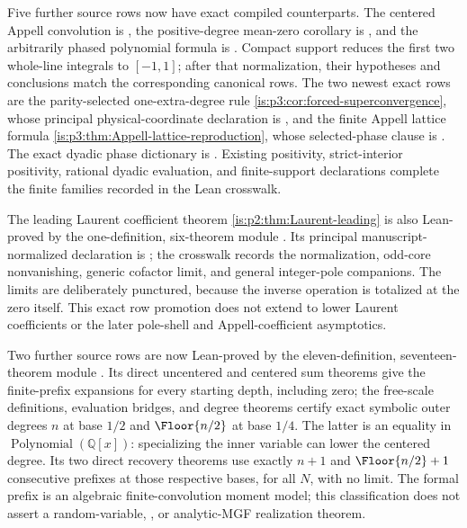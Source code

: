 Five further source rows now have exact compiled counterparts.  The centered
Appell convolution is
,
the positive-degree mean-zero corollary is
,
and the arbitrarily phased polynomial formula is
.
Compact support reduces the first two whole-line integrals to \([-1,1]\);
after that normalization, their hypotheses and conclusions match the
corresponding canonical rows.  The two newest exact rows are the
parity-selected one-extra-degree rule
\cref{is:p3:cor:forced-superconvergence}, whose principal physical-coordinate
declaration is
,
and the finite Appell lattice formula
\cref{is:p3:thm:Appell-lattice-reproduction}, whose selected-phase clause is
.
The exact dyadic phase dictionary is
.  Existing positivity,
strict-interior positivity, rational dyadic evaluation, and finite-support
declarations complete the finite families recorded in the Lean crosswalk.

The leading Laurent coefficient theorem
\cref{is:p2:thm:Laurent-leading} is also Lean-proved by the one-definition,
six-theorem module .  Its principal
manuscript-normalized declaration is
; the crosswalk
records the normalization, odd-core nonvanishing, generic cofactor limit, and
general integer-pole companions.  The limits are deliberately punctured,
because the inverse operation is totalized at the zero itself.  This exact row
promotion does not extend to lower Laurent coefficients or the later
pole-shell and Appell-coefficient asymptotics.

Two further source rows are now Lean-proved by the eleven-definition,
seventeen-theorem module
.  Its direct uncentered and
centered sum theorems give the finite-prefix expansions for every starting
depth, including zero; the free-scale definitions, evaluation bridges, and
degree theorems certify exact symbolic outer degrees \(n\) at base \(1/2\)
and \(\Floor{n/2}\) at base \(1/4\).  The latter is an equality in
\(\operatorname{Polynomial}(\mathbb Q[x])\): specializing the inner variable
can lower the centered degree.  Its two direct recovery theorems use exactly
\(n+1\) and \(\Floor{n/2}+1\) consecutive prefixes at those respective
bases, for all \(N\), with no limit.  The formal prefix is an algebraic
finite-convolution moment model; this classification does not assert a
random-variable, , or analytic-MGF realization theorem.


